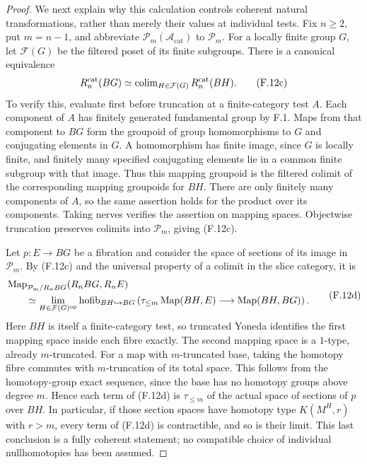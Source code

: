 \begin{proof}
We next explain why this calculation controls coherent natural
transformations, rather than merely their values at individual tests.
Fix $n\geq2$, put $m=n-1$, and abbreviate
$\mathcal P_m(\mathcal A_{\mathrm{cat}})$ to $\mathcal P_m$.
For a locally finite group $G$, let $\mathcal F(G)$ be the filtered
poset of its finite subgroups. There is a canonical equivalence
\[
 R_n^{\mathrm{cat}}(BG)
     \simeq\operatorname{colim}_{H\in\mathcal F(G)}R_n^{\mathrm{cat}}(BH).
 \tag{F.12c}
\]
To verify this, evaluate first before truncation at a finite-category
test $A$. Each component of $A$ has finitely generated fundamental
group by F.1. Maps from that component to $BG$ form the groupoid
of group homomorphisms to $G$ and conjugating elements in $G$.
A homomorphism has finite image, since $G$ is locally finite,
and finitely many specified conjugating elements lie in a common
finite subgroup with that image. Thus this mapping groupoid is
the filtered colimit of the corresponding mapping groupoids for
$BH$. There are only finitely many components of $A$, so the
same assertion holds for the product over its components.
Taking nerves verifies the assertion on mapping spaces. Objectwise
truncation preserves colimits into $\mathcal P_m$, giving (F.12c).

Let $p:E\to BG$ be a fibration and consider the space of sections
of its image in $\mathcal P_m$. By (F.12c) and the universal
property of a colimit in the slice category, it is
\[
 \begin{aligned}
 &\operatorname{Map}_{\mathcal P_m/R_nBG}(R_nBG,R_nE)\\
 &\qquad\simeq
 \lim_{H\in\mathcal F(G)^{\mathrm{op}}}
 \operatorname{hofib}_{BH\hookrightarrow BG}
 \left(\tau_{\leq m}\operatorname{Map}(BH,E)
          \longrightarrow\operatorname{Map}(BH,BG)\right).
 \end{aligned}
 \tag{F.12d}
\]
Here $BH$ is itself a finite-category test, so truncated Yoneda
identifies the first mapping space inside each fibre exactly.
The second mapping space is a $1$-type, already $m$-truncated.
For a map with $m$-truncated base, taking the homotopy fibre
commutes with $m$-truncation of its total space. This follows
from the homotopy-group exact sequence, since the base has no
homotopy groups above degree $m$. Hence each term of (F.12d)
is $\tau_{\leq m}$ of the actual space of sections of $p$ over
$BH$. In particular, if those section spaces have homotopy type
$K(M^H,r)$ with $r>m$, every term of (F.12d) is contractible,
and so is their limit. This last conclusion is a fully coherent
statement; no compatible choice of individual nullhomotopies
has been assumed.


\end{proof}
